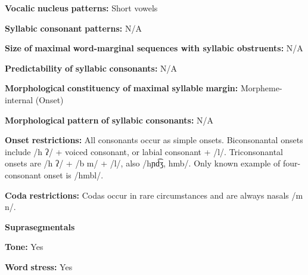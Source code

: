\documentclass[output=paper]{langsci/langscibook}
\begin{document}
\begin{styleBody}
\textbf{Vocalic} \textbf{nucleus} \textbf{patterns:} Short vowels
\end{styleBody}

\begin{styleBody}
\textbf{Syllabic} \textbf{consonant} \textbf{patterns:} N/A
\end{styleBody}

\begin{styleBody}
\textbf{Size} \textbf{of} \textbf{maximal} \textbf{word{}-marginal sequences with syllabic obstruents:} N/A
\end{styleBody}

\begin{styleBody}
\textbf{Predictability} \textbf{of} \textbf{syllabic} \textbf{consonants:} N/A
\end{styleBody}

\begin{styleBody}
\textbf{Morphological} \textbf{constituency} \textbf{of} \textbf{maximal} \textbf{syllable} \textbf{margin:} Morpheme-internal (Onset)
\end{styleBody}

\begin{styleBody}
\textbf{Morphological} \textbf{pattern} \textbf{of} \textbf{syllabic} \textbf{consonants:} N/A
\end{styleBody}

\begin{styleBody}
\textbf{Onset} \textbf{restrictions:} All consonants occur as simple onsets. Biconsonantal onsets include /h ʔ/ + voiced consonant, or labial consonant + /l/. Triconsonantal onsets are /h ʔ/ + /b m/ + /l/, also /hɲd͡ʒ, hmb/. Only known example of four-consonant onset is /hmbl/.
\end{styleBody}

\begin{styleBody}
\textbf{Coda} \textbf{restrictions:} Codas occur in rare circumstances and are always nasals /m n/.
\end{styleBody}

\begin{styleBody}
\textbf{Suprasegmentals}
\end{styleBody}

\begin{styleBody}
\textbf{Tone:} Yes
\end{styleBody}

\begin{styleBody}
\textbf{Word} \textbf{stress:} Yes
\end{styleBody}
\end{document}
